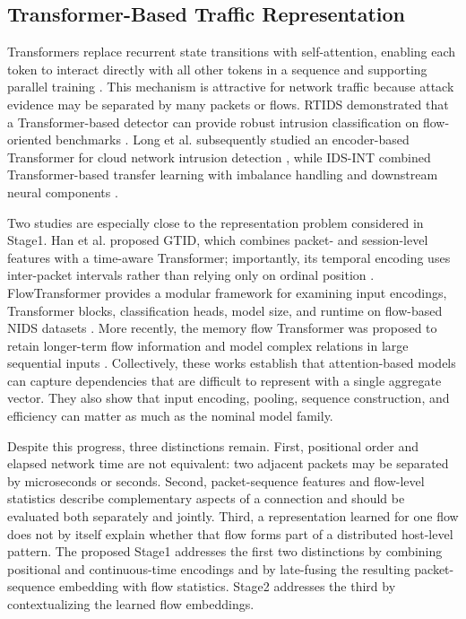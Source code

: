 \subsection{Transformer-Based Traffic Representation}
\label{subsec:rw_transformers}

Transformers replace recurrent state transitions with self-attention, enabling
each token to interact directly with all other tokens in a sequence and
supporting parallel training \cite{Vaswani2017}. This mechanism is attractive
for network traffic because attack evidence may be separated by many packets
or flows. RTIDS demonstrated that a Transformer-based detector can provide
robust intrusion classification on flow-oriented benchmarks
\cite{Wu2022RTIDS}. Long et al. subsequently studied an encoder-based
Transformer for cloud network intrusion detection
\cite{Long2024TransformerNIDS}, while IDS-INT combined Transformer-based
transfer learning with imbalance handling and downstream neural components
\cite{Ullah2024IDSINT}.

Two studies are especially close to the representation problem considered in
Stage1. Han et al. proposed GTID, which combines packet- and session-level
features with a time-aware Transformer; importantly, its temporal encoding uses
inter-packet intervals rather than relying only on ordinal position
\cite{Han2023GTID}. FlowTransformer provides a modular framework for examining
input encodings, Transformer blocks, classification heads, model size, and
runtime on flow-based NIDS datasets \cite{Manocchio2024FlowTransformer}. More
recently, the memory flow Transformer was proposed to retain longer-term flow
information and model complex relations in large sequential inputs
\cite{Jiang2025MFT}. Collectively, these works establish that attention-based
models can capture dependencies that are difficult to represent with a single
aggregate vector. They also show that input encoding, pooling, sequence
construction, and efficiency can matter as much as the nominal model family.

Despite this progress, three distinctions remain. First, positional order and
elapsed network time are not equivalent: two adjacent packets may be separated
by microseconds or seconds. Second, packet-sequence features and flow-level
statistics describe complementary aspects of a connection and should be
evaluated both separately and jointly. Third, a representation learned for one
flow does not by itself explain whether that flow forms part of a distributed
host-level pattern. The proposed Stage1 addresses the first two distinctions by
combining positional and continuous-time encodings and by late-fusing the
resulting packet-sequence embedding with flow statistics. Stage2 addresses the
third by contextualizing the learned flow embeddings.

